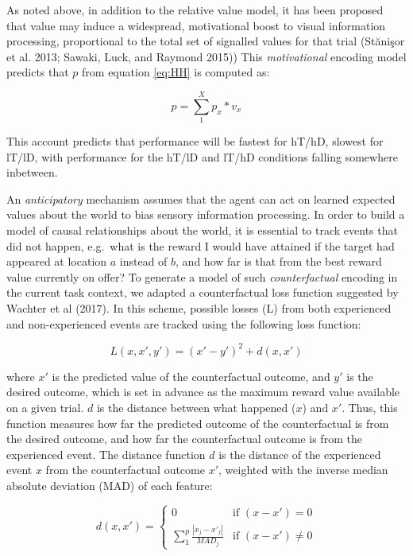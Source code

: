 \documentclass[11pt,halfline,a4paper,]{ouparticle}
\begin{document}
As noted above, in addition to the relative value model, it has been proposed that value may induce a widespread, motivational boost to visual information processing, proportional to the total set of signalled values for that trial (Stănişor et al. 2013; Sawaki, Luck, and Raymond 2015)) This \emph{motivational} encoding model predicts that \(p\) from equation \ref{eq:HH} is computed as:

\begin{equation}\label{eq:motiv}
  p = \sum_{1}^{X} p_x * v_x 
\end{equation}

This account predicts that performance will be fastest for hT/hD, slowest for lT/lD, with performance for the hT/lD and lT/hD conditions falling somewhere inbetween.

An \emph{anticipatory} mechanism assumes that the agent can act on learned expected values about the world to bias sensory information processing. In order to build a model of causal relationships about the world, it is essential to track events that did not happen, e.g.~what is the reward I would have attained if the target had appeared at location \(a\) instead of \(b\), and how far is that from the best reward value currently on offer? To generate a model of such \emph{counterfactual} encoding in the current task context, we adapted a counterfactual loss function suggested by Wachter et al (2017). In this scheme, possible losses (L) from both experienced and non-experienced events are tracked using the following loss function:

\begin{equation}\label{eq:counterFact}
  L(x, x', y') = (x' - y')^2 + d(x, x')
\end{equation}

where \(x'\) is the predicted value of the counterfactual outcome, and \(y'\) is the desired outcome, which is set in advance as the maximum reward value available on a given trial. \(d\) is the distance between what happened (\(x\)) and \(x'\). Thus, this function measures how far the predicted outcome of the counterfactual is from the desired outcome, and how far the counterfactual outcome is from the experienced event. The distance function \(d\) is the distance of the experienced event \(x\) from the counterfactual outcome \(x'\), weighted with the inverse median absolute deviation (MAD) of each feature:

\begin{equation}\label{eq:d}
  d(x, x') = 
    \begin{cases}
        0 &\text{if } (x - x') = 0 \\
        \sum_{1}^p \frac{|x_j - x'_j|}{MAD_j} &\text{if } (x - x') \neq 0
    \end{cases}
\end{equation}
\end{document}
